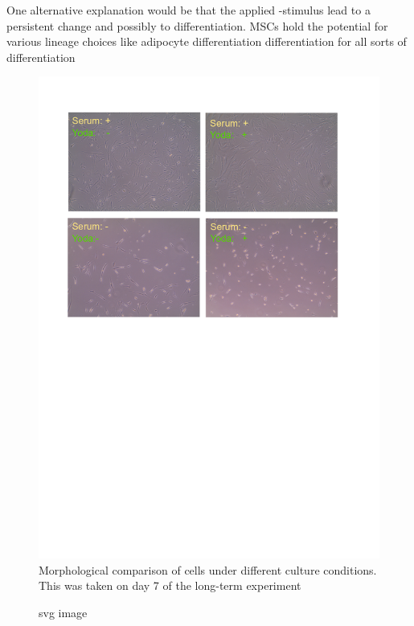 One alternative explanation would be that the applied \Yoda{}-stimulus lead to a persistent change and possibly to differentiation. MSCs hold the potential for various lineage choices like adipocyte differentiation differentiation for all sorts of differentiation

\begin{figure}[ht]
    \centering
    \includegraphics[width = \linewidth{}]{LongTerm_CellPicture.png}
    \caption{
    Morphological comparison of cells under different culture conditions. This was taken on day 7 of the long-term experiment
    }
    \label{}
\end{figure}




\begin{figure}[htbp]
  \centering
  
  \caption{svg image}
\end{figure}

